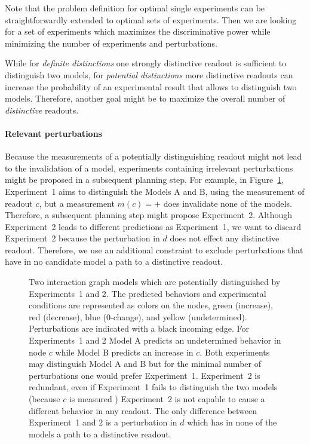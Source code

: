 Note that the problem definition for optimal single experiments can be straightforwardly
extended to optimal sets of experiments.
Then we are looking for a set of experiments which maximizes the discriminative
power while minimizing the number of experiments and perturbations.

While for \emph{definite distinctions} one strongly distinctive readout is
sufficient to distinguish two models,
for \emph{potential distinctions} more distinctive readouts can increase the
probability of an experimental result that allows to distinguish two models.
Therefore, another goal might be to maximize the overall number of
\emph{distinctive} readouts.


\paragraph*{\bf Relevant perturbations}

Because the measurements of a potentially distinguishing readout might not lead to the invalidation of a model,
experiments containing irrelevant perturbations might be proposed in a subsequent planning step.
For example, in Figure~\ref{fig:redundancy}, Experiment~1 aims to distinguish the Models A and B,
using the measurement of readout $c$,
but a measurement $m(c)=\plus$ does invalidate none of the models.
Therefore, a subsequent planning step might propose Experiment~2.
Although Experiment~2 leads to different predictions as Experiment~1,
we want to discard Experiment~2 because the perturbation in $d$ does not effect any distinctive readout.
Therefore, we use an additional constraint to exclude perturbations that have
in no candidate model a path to a distinctive readout.
%
\begin{figure}[]
\begin{center}

 \caption{
 Two interaction graph models which are potentially distinguished by Experiments~1 and 2.
 The predicted behaviors and experimental conditions are represented as colors on the nodes,
 green (increase), red (decrease), blue (0-change), and yellow (undetermined).
 Perturbations are indicated with a black incoming edge.
 For Experiments~1 and 2 Model A predicts an undetermined behavior in node $c$
  while Model B predicts an increase in $c$.
 Both experiments may distinguish Model A and B but for the minimal number of perturbations one would prefer
 Experiment~1.
 Experiment~2 is redundant, even if Experiment~1 fails to distinguish the two models (because $c$ is measured \plus)
 Experiment~2 is not capable to cause a different behavior in any readout.
 The only difference between Experiment~1 and 2 is a perturbation in $d$ which has in none of the models a path to a distinctive readout.
 }
\label{fig:redundancy}
\end{center}
\end{figure}



